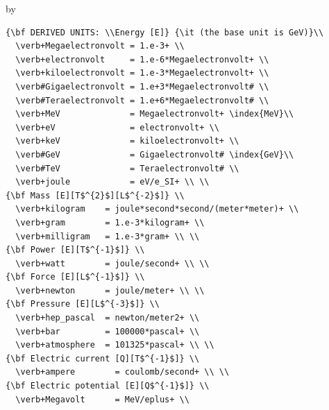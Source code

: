 \documentclass[twoside]{article}
\newcommand{\entrylabel}[1]{\mbox{\textbf{{#1}}}\hfil}%
\newenvironment{entry}
{\begin{list}{}%
    {\renewcommand{\makelabel}{\entrylabel}%
     \setlength{\labelwidth}{90pt}%
     \setlength{\leftmargin}{\labelwidth}
     \advance\leftmargin by \labelsep%
      }%
    }%
  {\end{list}}
\newcommand{\Entrylabel}[1]%
{\raisebox{0pt}[1ex][0pt]{\makebox[\labelwidth][l]%
    {\parbox[t]{\labelwidth}{\hspace{0pt}\textbf{{#1}}}}}}
\newenvironment{Entry}%
{\renewcommand{\entrylabel}{\Entrylabel}\begin{entry}}%
  {\end{entry}}
\begin{document}
\begin{description}
\begin{Entry}
\begin{verbatim}
{\bf DERIVED UNITS: \\Energy [E]} {\it (the base unit is GeV)}\\
  \verb+Megaelectronvolt = 1.e-3+ \\ 
  \verb+electronvolt     = 1.e-6*Megaelectronvolt+ \\ 
  \verb+kiloelectronvolt = 1.e-3*Megaelectronvolt+ \\ 
  \verb#Gigaelectronvolt = 1.e+3*Megaelectronvolt# \\ 
  \verb#Teraelectronvolt = 1.e+6*Megaelectronvolt# \\ 
  \verb+MeV              = Megaelectronvolt+ \index{MeV}\\   
  \verb+eV               = electronvolt+ \\
  \verb+keV              = kiloelectronvolt+ \\
  \verb#GeV              = Gigaelectronvolt# \index{GeV}\\  
  \verb#TeV              = Teraelectronvolt# \\
  \verb+joule            = eV/e_SI+ \\ \\
{\bf Mass [E][T$^{2}$][L$^{-2}$]} \\
  \verb+kilogram    = joule*second*second/(meter*meter)+ \\
  \verb+gram        = 1.e-3*kilogram+ \\
  \verb+milligram   = 1.e-3*gram+ \\ \\
{\bf Power [E][T$^{-1}$]} \\
  \verb+watt        = joule/second+ \\ \\
{\bf Force [E][L$^{-1}$]} \\
  \verb+newton      = joule/meter+ \\ \\
{\bf Pressure [E][L$^{-3}$]} \\
  \verb+hep_pascal  = newton/meter2+ \\
  \verb+bar         = 100000*pascal+ \\
  \verb+atmosphere  = 101325*pascal+ \\ \\
{\bf Electric current [Q][T$^{-1}$]} \\
  \verb+ampere        = coulomb/second+ \\ \\
{\bf Electric potential [E][Q$^{-1}$]} \\
  \verb+Megavolt      = MeV/eplus+ \\

\end{verbatim}
\end{Entry}
\end{description}
\end{document}

